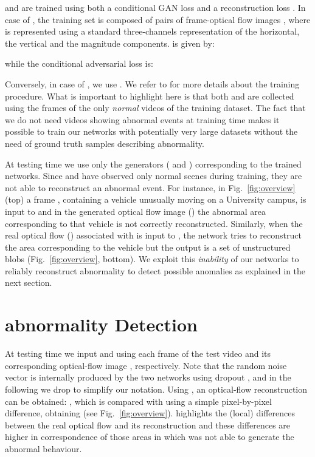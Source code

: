 \documentclass{article}
\begin{document}
	
	 and  are trained using both a conditional GAN loss  and a reconstruction loss
	. In case of , the training set is composed of pairs of frame-optical flow images
	, where  is represented using a standard three-channels representation of the horizontal, the vertical and the magnitude components. 
	 is given by:
	
	\noindent
	while the conditional adversarial loss  is:

	Conversely, in case of , we use . We refer to \cite{DBLP:journals/corr/IsolaZZE16} for more details about the training procedure. 
What is important to highlight here is that both  and  are collected 
	using the frames of the only {\em normal} videos of the training dataset. 
	The fact that we do not need videos showing abnormal events at training time makes it possible to train our networks with potentially very large datasets without the need of ground truth samples describing abnormality.
	
	At testing time we use only the generators ( and ) corresponding to the trained networks.
	Since  and  have observed 
	only normal scenes during training, they are not able to reconstruct an abnormal event. 
	For instance, in Fig.~\ref{fig:overview} (top) a frame , containing a vehicle unusually moving on a University campus,
	is input to  and in the generated optical flow image () the abnormal area corresponding to that vehicle is not correctly reconstructed. Similarly, when the real optical flow () associated with  is input to , the network tries to reconstruct the area corresponding to the vehicle but the output is a set of unstructured blobs (Fig.~\ref{fig:overview}, bottom).
	We exploit this {\em inability} of our networks to reliably reconstruct abnormality to detect possible anomalies as explained in the next section.
	
	
	\section{abnormality Detection}
	\label{sec:Detection}
	
	At testing time we input  and  using each frame  of the test video and its corresponding optical-flow image , respectively.
	Note that the random noise vector  is internally produced by the two networks using dropout \cite{DBLP:journals/corr/IsolaZZE16}, and 
	in the following 
	we drop  to simplify our notation.
	Using , an optical-flow reconstruction can be obtained: , which is compared with  using a simple pixel-by-pixel difference, obtaining  (see Fig.~\ref{fig:overview}).  highlights the (local) differences between the real optical flow and its reconstruction and these differences are higher in correspondence of those areas in which  was not able to generate the abnormal behaviour. 
	
\end{document}
